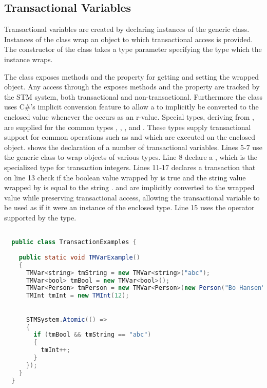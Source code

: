 \subsection{Transactional Variables}
\label{subsec:stm_impl_transactional_variables}
Transactional variables are created by declaring instances of the generic  class. Instances of the  class wrap an object to which transactional access is provided.  The constructor of the  class takes a type parameter specifying the type which the  instance wraps.

The  class exposes methods and the  property for getting and setting the wrapped object. Any access through the exposes methods and the  property are tracked by the \ac{STM} system, both transactional and non-transactional. Furthermore the  class uses C\#'s implicit conversion feature to allow a  to implicitly be converted to the enclosed value whenever the  occurs as an r-value. Special types, deriving from , are supplied for the common types , , ,   and . These types supply transactional support for common operations such as \bscode{++} and \bscode{--} which are executed on the enclosed object.   shows the declaration of a number of transactional variables. Lines 5-7 use the generic  class to wrap objects of various types. Line 8 declare a , which is the specialized type for transaction integers. Lines 11-17 declares a transaction that on line 13 check if the boolean value wrapped by  is true and the string value wrapped by  is equal to the string .  and  are implicitly converted to the wrapped value while preserving transactional access, allowing the transactional variable to be used as if it were an instance of the enclosed type. Line 15 uses the \bscode{++} operator supported by the  type.
\begin{lstlisting}[label=lst:library_tmvar,
  caption={Library Transactional Variable},
  language=Java,  
  showspaces=false,
  showtabs=false,
  breaklines=true,
  showstringspaces=false,
  breakatwhitespace=true,
  commentstyle=\color{greencomments},
  keywordstyle=\color{bluekeywords},
  stringstyle=\color{redstrings},
  morekeywords={atomic, retry, orElse, var, get, set, string, bool}]  % Start your code-block

  public class TransactionExamples {
      
    public static void TMVarExample()
    {
      TMVar<string> tmString = new TMVar<string>("abc");
      TMVar<bool> tmBool = new TMVar<bool>();
      TMVar<Person> tmPerson = new TMVar<Person>(new Person("Bo Hansen", 57));
      TMInt tmInt = new TMInt(12);
           

      STMSystem.Atomic(() =>
      {
        if (tmBool && tmString == "abc")
        {
          tmInt++;
        }
      });
    }
  }
\end{lstlisting}
